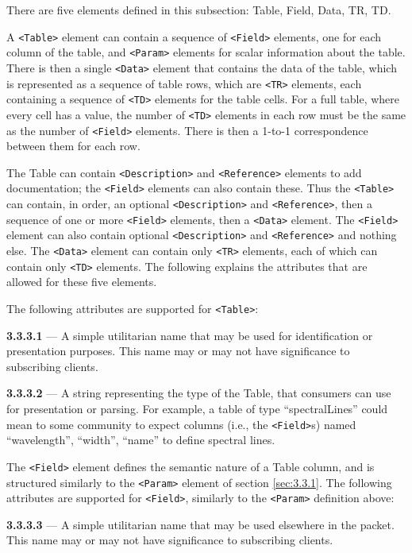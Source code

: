 \documentclass[11pt,a4paper]{ivoa}
\begin{document}
There are five elements defined in this subsection: Table, Field, Data, TR, TD.

A \verb|<Table>| element can contain a sequence of \verb|<Field>| elements, one
for each column of the table, and \verb|<Param>| elements for scalar information
about the table. There is then a single \verb|<Data>| element that contains the
data of the table, which is represented as a sequence of table rows, which are
\verb|<TR>| elements, each containing a sequence of \verb|<TD>| elements for the
table cells. For a full table, where every cell has a value, the number
of \verb|<TD>| elements in each row must be the same as the number of \verb|<Field>|
elements. There is then a 1-to-1 correspondence between them for each row.

The Table can contain \verb|<Description>| and \verb|<Reference>| elements to add
documentation; the \verb|<Field>| elements can also contain these. Thus
the \verb|<Table>| can contain, in order, an optional \verb|<Description>| and 
\verb|<Reference>|, then a sequence of one or more \verb|<Field>| elements, then a
\verb|<Data>| element. The \verb|<Field>| element can also contain
optional \verb|<Description>| and \verb|<Reference>| and nothing else. The \verb|<Data>| element
can contain only \verb|<TR>| elements, each of which can contain only \verb|<TD>|
elements. The following explains the attributes that are allowed for these five
elements.

The following attributes are supported for \verb|<Table>|:

\noindent \textbf{3.3.3.1} \label{sec:3.3.3.1} --- A simple utilitarian
name that may be used for identification or presentation purposes. This name
may or may not have significance to subscribing clients.

\noindent \textbf{3.3.3.2} \label{sec:3.3.3.2} --- A string representing
the type of the Table, that consumers can use for presentation or parsing. For
example, a table of type ``spectralLines'' could mean to some community to
expect columns (i.e., the \verb|<Field>|s) named ``wavelength'', ``width'',
``name'' to define spectral lines.

The \verb|<Field>| element defines the semantic nature of a Table column, and is
structured similarly to the \verb|<Param>| element of section \ref{sec:3.3.1}.
The following attributes are supported for \verb|<Field>|, similarly to the
\verb|<Param>| definition above:

\noindent \textbf{3.3.3.3} \label{sec:3.3.3.3} --- A simple utilitarian
name that may be used elsewhere in the packet. This name may or may not have
significance to subscribing clients.
\end{document}
